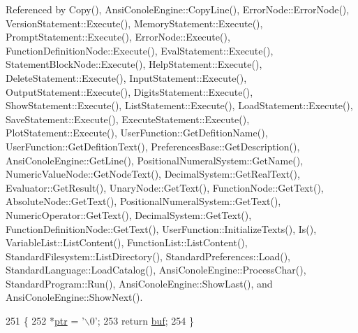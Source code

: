Referenced by Copy(), Ansi\+Conole\+Engine\+::\+Copy\+Line(), Error\+Node\+::\+Error\+Node(), Version\+Statement\+::\+Execute(), Memory\+Statement\+::\+Execute(), Prompt\+Statement\+::\+Execute(), Error\+Node\+::\+Execute(), Function\+Definition\+Node\+::\+Execute(), Eval\+Statement\+::\+Execute(), Statement\+Block\+Node\+::\+Execute(), Help\+Statement\+::\+Execute(), Delete\+Statement\+::\+Execute(), Input\+Statement\+::\+Execute(), Output\+Statement\+::\+Execute(), Digits\+Statement\+::\+Execute(), Show\+Statement\+::\+Execute(), List\+Statement\+::\+Execute(), Load\+Statement\+::\+Execute(), Save\+Statement\+::\+Execute(), Execute\+Statement\+::\+Execute(), Plot\+Statement\+::\+Execute(), User\+Function\+::\+Get\+Defition\+Name(), User\+Function\+::\+Get\+Defition\+Text(), Preferences\+Base\+::\+Get\+Description(), Ansi\+Conole\+Engine\+::\+Get\+Line(), Positional\+Numeral\+System\+::\+Get\+Name(), Numeric\+Value\+Node\+::\+Get\+Node\+Text(), Decimal\+System\+::\+Get\+Real\+Text(), Evaluator\+::\+Get\+Result(), Unary\+Node\+::\+Get\+Text(), Function\+Node\+::\+Get\+Text(), Absolute\+Node\+::\+Get\+Text(), Positional\+Numeral\+System\+::\+Get\+Text(), Numeric\+Operator\+::\+Get\+Text(), Decimal\+System\+::\+Get\+Text(), Function\+Definition\+Node\+::\+Get\+Text(), User\+Function\+::\+Initialize\+Texts(), Is(), Variable\+List\+::\+List\+Content(), Function\+List\+::\+List\+Content(), Standard\+Filesystem\+::\+List\+Directory(), Standard\+Preferences\+::\+Load(), Standard\+Language\+::\+Load\+Catalog(), Ansi\+Conole\+Engine\+::\+Process\+Char(), Standard\+Program\+::\+Run(), Ansi\+Conole\+Engine\+::\+Show\+Last(), and Ansi\+Conole\+Engine\+::\+Show\+Next().


\begin{DoxyCode}
251 \{
252     *\hyperlink{classCharBuffer_a2d313433650506fd6609e6947729dfb0}{ptr} = \textcolor{charliteral}{'\(\backslash\)0'};
253     \textcolor{keywordflow}{return} \hyperlink{classCharBuffer_a8bcd8491b24db4197b311eb361609674}{buf};
254 \}
\end{DoxyCode}


